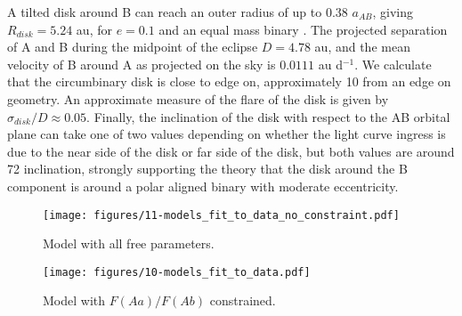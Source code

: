 \documentclass{aa}
\begin{document}
%
%

A tilted disk around B can reach an outer radius of up to 0.38 $a_{AB}$, giving $R_{disk}=5.24$ au, for $e=0.1$ and an equal mass binary \citep[see Figure 4 from ][]{Miranda2015}.
%
The projected separation of A and B during the midpoint of the eclipse $D=4.78$ au, and the mean velocity of B around A as projected on the sky is $0.0111$ au d$^{-1}$.
%
We calculate that the circumbinary disk is close to edge on, approximately 10\degr{} from an edge on geometry.
%
An approximate measure of the flare of the disk is given by $\sigma_{disk}/D \approx 0.05$.
%
Finally, the inclination of the disk with respect to the AB orbital plane can take one of two values depending on whether the light curve ingress is due to the near side of the disk or far side of the disk, but both values are around 72\degr{} inclination, strongly supporting the theory that the disk around the B component is around a polar aligned binary with moderate eccentricity.




\begin{figure}[ht]
\begin{center}
    \centering
    \texttt{[image: figures/11-models\_fit\_to\_data\_no\_constraint.pdf]}
    \caption{Model with all free parameters.}
\label{fig:fitallfree}
\end{center}
\end{figure}

\begin{figure}[ht]
\begin{center}
    \centering
    \texttt{[image: figures/10-models\_fit\_to\_data.pdf]}
    \caption{Model with $F(Aa)/F(Ab)$ constrained.}
\label{fig:fitconstrained}
\end{center}
\end{figure}
\end{document}
